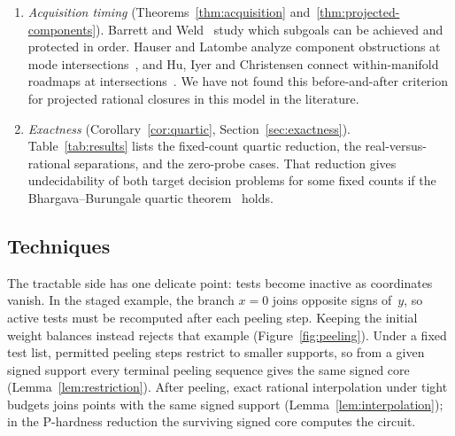 \begin{enumerate}
antecedent, and \emph{Toric Cubes}~\cite{toriccubes} related fixed-support
geometry. Geiger--Meek--Sturmfels~\cite{geigermeeksturmfels} and
Rauh--Kahle--Ay~\cite{rauhkahleay} give facial-support criteria for positive
model families, while Payne~\cite{payne} and
Soprunova--Sottile~\cite{soprunovasottile} study real toric varieties.
Diaconis--Eisenbud--Sturmfels~\cite{diaconiseisenbudsturmfels} and
Kahle--Rauh--Sullivant~\cite{kahlerauhsullivant} relate discrete
connectivity to binomial ideals for fixed move sets. Our additional steps are
restriction across recomputed supports, the least support, and exact rational
realization under budgets.
\item \emph{Acquisition timing} (Theorems~\ref{thm:acquisition}
and~\ref{thm:projected-components}). Barrett and
Weld~\cite[Sections~3.2--3.3]{barrettweld} study which subgoals can be
achieved and protected in order. Hauser and Latombe analyze component
obstructions at mode intersections~\cite{hauserlatombe}, and Hu, Iyer and
Christensen connect within-manifold roadmaps at
intersections~\cite{huiyerchristensen}. We have not found this
before-and-after criterion for projected rational closures in this model in
the literature.
\item \emph{Exactness} (Corollary~\ref{cor:quartic},
Section~\ref{sec:exactness}). Table~\ref{tab:results} lists the fixed-count
quartic reduction, the real-versus-rational separations, and the zero-probe
cases. That reduction gives undecidability of both target decision problems
for some fixed counts if the Bhargava--Burungale quartic
theorem~\cite[Corollary~1.2(3)]{bhargavaburungale} holds.
\end{enumerate}

\subsection{Techniques}\label{sec:techniques}

The tractable side has one delicate point: tests become inactive as
coordinates vanish. In the staged example, the branch $x=0$ joins opposite
signs of~$y$, so active tests must be recomputed after each peeling step.
Keeping the initial weight balances instead rejects that example
(Figure~\ref{fig:peeling}). Under a fixed test list, permitted peeling steps
restrict to smaller supports, so from a given signed support every terminal
peeling sequence gives the same signed core (Lemma~\ref{lem:restriction}).
After peeling, exact rational interpolation under tight budgets joins points
with the same signed support (Lemma~\ref{lem:interpolation}); in the
P-hardness reduction the surviving signed core computes the circuit.

